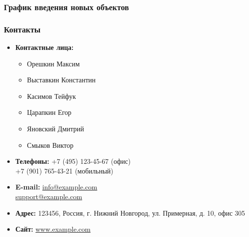 \documentclass[a4paper,12pt]{article}
\begin{document}
\subsubsection{График введения новых объектов}
\subsubsection{Контакты}
\begin{itemize}[label=$\ast$, leftmargin=2cm]
    \item \textbf{Контактные лица:}  
    \begin{itemize}[label=\textbullet, leftmargin=1cm]
        \item Орешкин Максим
        \item Выставкин Константин
        \item Касимов Тейфук
        \item Царапкин Егор
        \item Яновский Дмитрий
        \item Смыков Виктор
    \end{itemize}
   

    \item \textbf{Телефоны:}  
    +7 (495) 123-45-67 (офис) \\ 
    +7 (901) 765-43-21 (мобильный) 

    \item \textbf{E-mail:}  
    \href{mailto:info@example.com}{info@example.com} \\
    \href{mailto:support@example.com}{support@example.com}

    \item \textbf{Адрес:}  
    123456, Россия, г. Нижний Новгород, ул. Примерная, д. 10, офис 305

    \item \textbf{Сайт:}  
    \href{http://www.example.com}{www.example.com}
\end{itemize}
\end{document}
